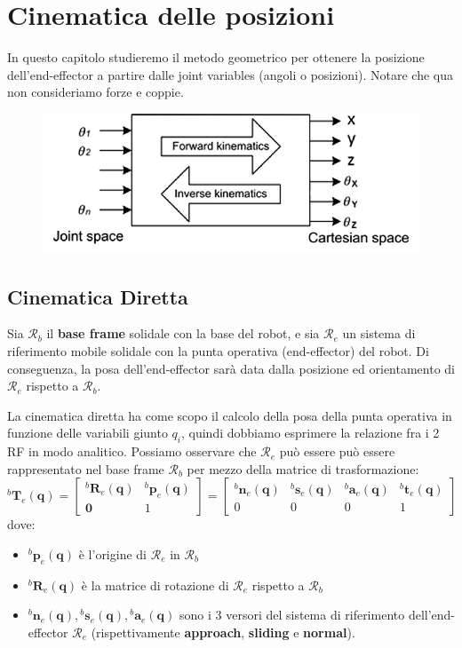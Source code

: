 \chapter{Cinematica delle posizioni}

In questo capitolo studieremo il metodo geometrico per ottenere la posizione dell'end-effector a partire dalle joint variables (angoli o posizioni). Notare che qua non consideriamo forze e coppie.
\vspace*{5pt}
\begin{figure}[H]
	\centering
	\includegraphics[width=0.5\linewidth]{images/kinematics_1}
	\label{fig:kinematics1}
\end{figure}


\section{Cinematica Diretta}

Sia $\mathcal{R}_b$ il \textbf{base frame} solidale con la base del robot, e sia $\mathcal{R}_e$ un sistema di riferimento mobile solidale con la punta operativa (end-effector) del robot.
Di conseguenza, la posa dell'end-effector sarà data dalla posizione ed orientamento di $\mathcal{R}_e$ rispetto a $\mathcal{R}_b$.

La cinematica diretta ha come scopo il calcolo della posa della punta operativa in funzione delle variabili giunto $q_i$, quindi dobbiamo esprimere la relazione fra i 2 RF in modo analitico.
Possiamo osservare che $\mathcal{R}_e$ può essere può essere rappresentato nel base frame $\mathcal{R}_b$ per mezzo della matrice di trasformazione:
$$
{}^b\textbf{T}_e(\mathbf{q}) = 
\begin{bmatrix}
	{}^b\mathbf{R}_e(\mathbf{q}) & {}^b\textbf{p}_e(\mathbf{q}) \\
	\mathbf{0} & 1
\end{bmatrix}
=
\begin{bmatrix}
	{}^b\mathbf{n}_e(\mathbf{q}) &
	{}^b\mathbf{s}_e(\mathbf{q}) & 
	{}^b\mathbf{a	}_e(\mathbf{q}) & 
	{}^b\textbf{t}_e(\mathbf{q}) \\
	0 & 0 & 0 & 1
\end{bmatrix}
$$
dove:
\begin{itemize}
	\item ${}^b\textbf{p}_e(\mathbf{q})$ è l'origine di $\mathcal{R}_e$ in $\mathcal{R}_b$
	\item ${}^b\mathbf{R}_e(\mathbf{q})$ è la matrice di rotazione di $\mathcal{R}_e$ rispetto a $\mathcal{R}_b$
	\item $	{}^b\mathbf{n}_e(\mathbf{q}), {}^b\mathbf{s}_e(\mathbf{q}), {}^b\mathbf{a	}_e(\mathbf{q})$ sono i 3 versori del sistema di riferimento dell'end-effector $\mathcal{R}_e$ (rispettivamente \textbf{approach}, \textbf{sliding} e \textbf{normal}).
\end{itemize}

